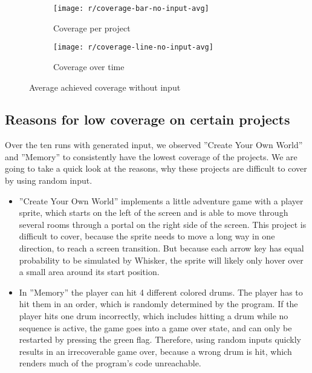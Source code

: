 \begin{figure}[htpb]
    \centering
    \begin{subfigure}{.8\textwidth}
        \texttt{[image: r/coverage-bar-no-input-avg]}
        \caption{Coverage per project}
        \label{fig:coverage_no_input_bar}
    \end{subfigure}

    \bigskip

    \begin{subfigure}{.8\textwidth}
        \texttt{[image: r/coverage-line-no-input-avg]}
        \caption{Coverage over time}
        \label{fig:coverage_no_input_line}
    \end{subfigure}

    \caption{Average achieved coverage without input}
    \label{fig:coverage_no_input}
\end{figure}

\subsection{Reasons for low coverage on certain projects}

Over the ten runs with generated input, we observed ''Create Your Own World'' and ''Memory'' to consistently have the lowest coverage of the projects.
We are going to take a quick look at the reasons, why these projects are difficult to cover by using random input.

\begin{itemize}
    \item ''Create Your Own World'' implements a little adventure game with a player sprite, which starts on the left of the screen and is able to move through several rooms through a portal on the right side of the screen.
        This project is difficult to cover, because the sprite needs to move a long way in one direction, to reach a screen transition.
        But because each arrow key has equal probability to be simulated by Whisker, the sprite will likely only hover over a small area around its start position.
    \item In ''Memory'' the player can hit 4 different colored drums.
        The player has to hit them in an order, which is randomly determined by the program.
        If the player hits one drum incorrectly, which includes hitting a drum while no sequence is active, the game goes into a game over state,
        and can only be restarted by pressing the green flag.
        Therefore, using random inputs quickly results in an irrecoverable game over,
        because a wrong drum is hit, which renders much of the program's code unreachable.
\end{itemize}


